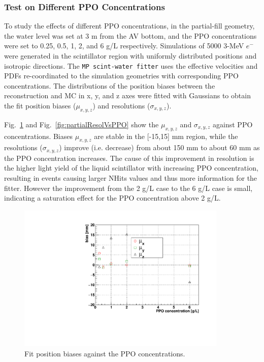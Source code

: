 \subsubsection{Test on Different PPO Concentrations}\label{sect:ppoConcentration}

To study the effects of different PPO concentrations, in the partial-fill geometry, the water level was set at 3 m from the AV bottom, and the PPO concentrations were set to 0.25, 0.5, 1, 2, and 6 g/L respectively. Simulations of 5000 3-MeV $e^-$ were generated in the scintillator region with uniformly distributed positions and isotropic directions. The \texttt{MP scint-water fitter} uses the effective velocities and PDFs re-coordinated to the simulation geometries with corresponding PPO concentrations. The distributions of the position biases between the reconstruction and MC in x, y, and z axes were fitted with Gaussians to obtain the fit position biases ($\mu_{x,y,z}$) and resolutions ($\sigma_{x,y,z}$).

Fig.~\ref{fig:partialBiasVsPPO} and Fig.~\ref{fig:partialResolVsPPO} show the $\mu_{x,y,z}$ and $\sigma_{x,y,z}$ against PPO concentrations. Biases $\mu_{x,y,z}$ are stable in the [-15,15] mm region, while the resolutions ($\sigma_{x,y,z}$) improve (i.e. decrease) from about 150 mm to about 60 mm as the PPO concentration increases. The cause of this improvement in resolution is the higher light yield of the liquid scintillator with increasing PPO concentration, resulting in events causing larger NHits values and thus more information for the fitter. However the improvement from the 2 g/L case to the 6 g/L case is small, indicating a saturation effect for the PPO concentration above 2 g/L.

\begin{figure}[!htb]
	\centering
	\includegraphics[width=10cm]{partialBiasVsPPO.pdf}
	\caption{Fit position biases against the PPO concentrations.}
	\label{fig:partialBiasVsPPO}
\end{figure}

